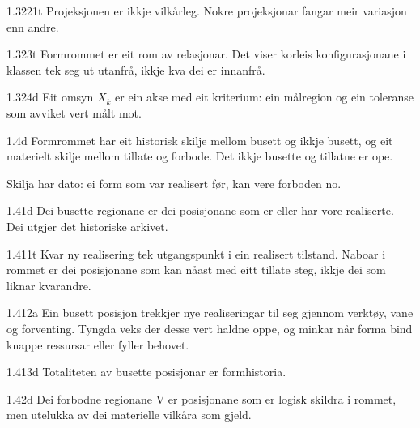 \begin{formproposition}{1.3221}{t}
Projeksjonen er ikkje vilkårleg. Nokre projeksjonar fangar meir variasjon enn andre.
\end{formproposition}

\begin{formproposition}{1.323}{t}
Formrommet er eit rom av relasjonar. Det viser korleis konfigurasjonane i klassen tek seg ut utanfrå, ikkje kva dei er innanfrå.
\end{formproposition}

\begin{formproposition}{1.324}{d}
Eit omsyn \(X_k\) er ein akse med eit kriterium: ein målregion og ein toleranse som avviket vert målt mot.
\end{formproposition}

\begin{formproposition}{1.4}{d}
Formrommet har eit historisk skilje mellom busett og ikkje busett, og eit materielt skilje mellom tillate og forbode. Det ikkje busette og tillatne er ope.

Skilja har dato: ei form som var realisert før, kan vere forboden no.
\end{formproposition}

\begin{formproposition}{1.41}{d}
Dei busette regionane er dei posisjonane som er eller har vore realiserte. Dei utgjer det historiske arkivet.
\end{formproposition}

\begin{formproposition}{1.411}{t}
Kvar ny realisering tek utgangspunkt i ein realisert tilstand. Naboar i rommet er dei posisjonane som kan nåast med eitt tillate steg, ikkje dei som liknar kvarandre.
\end{formproposition}

\begin{formproposition}{1.412}{a}
Ein busett posisjon trekkjer nye realiseringar til seg gjennom verktøy, vane og forventing. Tyngda veks der desse vert haldne oppe, og minkar når forma bind knappe ressursar eller fyller behovet.
\end{formproposition}

\begin{formproposition}{1.413}{d}
Totaliteten av busette posisjonar er formhistoria.
\end{formproposition}

\begin{formproposition}{1.42}{d}
Dei forbodne regionane V er posisjonane som er logisk skildra i rommet, men utelukka av dei materielle vilkåra som gjeld.
\end{formproposition}


